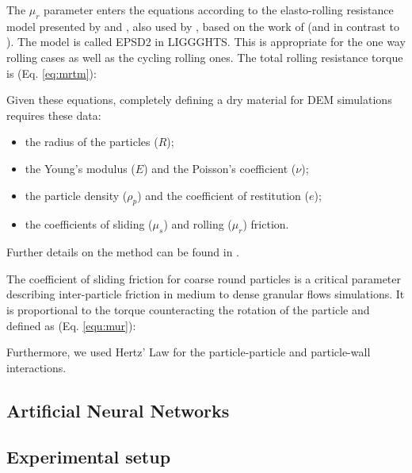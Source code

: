 The $\mu_r$ parameter enters the equations according to the elasto-rolling resistance model presented by \cite{RefWorks:87} and \cite{RefWorks:131}, also used by \cite{RefWorks:147}, 
based on the work of \cite{RefWorks:143}(and in contrast to \cite{RefWorks:144}). The model is called EPSD2 in LIGGGHTS.
This is appropriate for the one way rolling cases as well as the cycling rolling ones.
The total rolling resistance torque is (Eq. \ref{eq:mrtm}):


Given these equations, completely defining a dry material for DEM simulations requires these data:
\begin{itemize}
\item{the radius of the particles ($R$);}
\item{the Young's modulus ($E$) and the Poisson's coefficient ($\nu$);}
\item{the particle density ($\rho_p$) and the coefficient of restitution ($e$);}
\item{the coefficients of sliding ($\mu_s$) and rolling ($\mu_r$) friction.}
\end{itemize}


Further details on the method can be found in \cite{RefWorks:133}.

The coefficient of sliding friction for coarse round particles is a critical
parameter describing inter-particle friction in medium to dense granular flows simulations.
It is proportional to the torque counteracting the rotation of the particle and defined as (Eq. \ref{equ:mur}):


Furthermore, we used Hertz' Law for the particle-particle and particle-wall interactions.



\subsection{Artificial Neural Networks}
\label{subsec:ann}


\subsection{Experimental setup}
\label{subsec:experimentalsetup}




